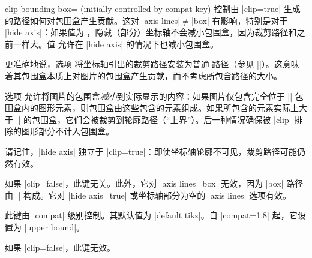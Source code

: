 \begin{pgfplotskey}{%
    clip bounding box= (initially controlled by compat key)%
}
    控制由 |clip=true| 生成的路径如何对包围盒产生贡献。这对 |axis lines|$\neq$|box| 有影响，特别是对于 |hide axis|：如果值为 ，隐藏（部分）坐标轴不会减小包围盒，因为裁剪路径和之前一样大。值  允许在 |hide axis| 的情况下也减小包围盒。

    更准确地说，选项  将坐标轴引出的裁剪路径安装为普通 \tikzname{} 路径（参见 |\pgfplotspathaxisoutline|）。这意味着其包围盒本质上对图片的包围盒产生贡献，而不考虑所包含路径的大小。

    选项  允许将图片的包围盒\emph{减小}到实际显示的内容：如果图片仅包含完全位于 |\pgfplotspathaxisoutline| 包围盒内的图形元素，则包围盒由这些包含的元素组成。如果所包含的元素实际上大于 |\pgfplotspathaxisoutline| 的包围盒，它们会被裁剪到轮廓路径（“上界”）。后一种情况确保被 |clip| 排除的图形部分不计入包围盒。

    请记住，|hide axis| 独立于 |clip=true|：即使坐标轴轮廓不可见，裁剪路径可能仍然有效。

    如果 |clip=false|，此键无关。此外，它对 |axis lines=box| 无效，因为 |box| 路径由 |\pgfplotspathaxisoutline| 构成。它对 |hide axis=true| 或坐标轴部分为空的 |axis lines| 选项有效。

    此键由 |compat| 级别控制。其默认值为 |default tikz|。自 |compat=1.8| 起，它设置为 |upper bound|。

    如果 |clip=false|，此键无效。
\end{pgfplotskey}

